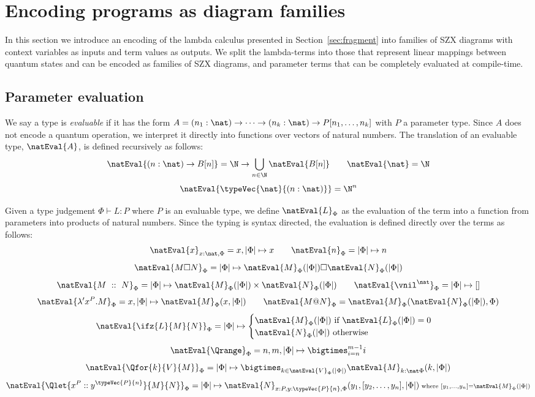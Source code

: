 \section{Encoding programs as diagram families}%
\label{sec:translation}

In this section we introduce an encoding of the lambda calculus presented in Section~\ref{sec:fragment}
into families of SZX diagrams with context variables as inputs and term values as outputs.
We split the lambda-terms into those that represent linear mappings between quantum states
and can be encoded as families of SZX diagrams, and parameter terms that can be completely evaluated
at compile-time.

\subsection{Parameter evaluation}

We say a type is \textit{evaluable} if it has the form
$A = (n_1:\nat) \to \dots \to (n_k:\nat) \to P[n_1,\dots,n_k]$ with $P$ a parameter type.
Since $A$ does not encode a quantum operation,
we interpret it directly into functions over vectors of natural numbers.
The translation of an evaluable type, $\natEval{A}$, is defined recursively as follows:
\[
    \natEval{(n : \nat) \to B[n]} = \N \to \bigcup_{n \in \N} \natEval{B[n]}
    \qquad
    \natEval{\nat} = \N
\]
\[
    \natEval{\typeVec{\nat}{(n : \nat)}} = \N^n
\]

Given a type judgement $\Phi \vdash L : P$ where $P$ is an evaluable type,
we define $\natEval{L}_\Phi$ as the evaluation of the term into a function from parameters into products of natural numbers.
Since the typing is syntax directed, the evaluation is defined directly over the terms as follows:
\[
    \natEval{x}_{x:\nat, \Phi} = x,|\Phi| \mapsto x
    \qquad
    \natEval{n}_\Phi = |\Phi| \mapsto n
\]
\[
    \natEval{M \square N}_\Phi = |\Phi| \mapsto \natEval{M}_\Phi(|\Phi|) \square \natEval{N}_\Phi(|\Phi|)
\]
\[
    \natEval{M\ ::\ N}_{\Phi} = |\Phi| \mapsto \natEval{M}_\Phi(|\Phi|) \times \natEval{N}_\Phi(|\Phi|)
    \qquad 
    \natEval{\vnil^\nat}_{\Phi} = |\Phi| \mapsto []
\]
\[
    \natEval{\lambda' x^P.M}_\Phi = x,|\Phi| \mapsto \natEval{M}_\Phi(x,|\Phi|)
    \qquad
    \natEval{M @ N}_\Phi = \natEval{M}_\Phi(\natEval{N}_\Phi(|\Phi|), \Phi)
\]
\[
    \natEval{\ifz{L}{M}{N}}_\Phi = |\Phi| \mapsto \begin{cases}
        \natEval{M}_\Phi(|\Phi|) \text{ if } \natEval{L}_\Phi(|\Phi|) = 0 \\
        \natEval{N}_\Phi(|\Phi|) \text{ otherwise}
    \end{cases}
\]
\[
    \natEval{\Qrange}_\Phi = n,m,|\Phi| \mapsto \bigtimes_{i=n}^{m-1} i
\]
\[
    \natEval{\Qfor{k}{V}{M}}_\Phi = |\Phi| \mapsto \bigtimes_{k\in \natEval{V}_\Phi(|\Phi|)} \natEval{M}_{k:\nat\Phi}(k, |\Phi|)
\]
\[
    \natEval{\Qlet{x^P :: y^{\typeVec{P}{n}}}{M}{N}}_\Phi = |\Phi|\mapsto 
        \natEval{N}_{x:P, y:\typeVec{P}{n}, \Phi}(y_1,[y_2,\dots,y_n],|\Phi|)
    {\scriptstyle{\text{ where } [y_1,\dots,y_n] = \natEval{M}_\Phi(|\Phi|)}}
\]

